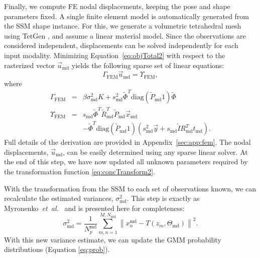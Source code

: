 \documentclass[journal]{IEEEtran}
\newcommand{\trans}[1]{#1^{\scriptscriptstyle T}}
\newcommand{\diag}{\mathrm{diag}}
\begin{document}
Finally, we compute FE nodal displacements, keeping the pose and shape parameters fixed.  A single finite element model is automatically generated from the SSM shape instance.  For this, we generate a volumetric tetrahedral mesh using TetGen \cite{Si06a}, and assume a linear material model.  Since the observations are considered independent, displacements can be solved independently for each input modality. Minimizing Equation~\eqref{eq:objTotal2} with respect to the rasterized vector $\vec{u}_\mathrm{md}$ yields the following sparse set of linear equations:
\begin{equation} \label{eq:FEM1}
\Gamma_{\mathrm{FEM}}\vec{u}_\mathrm{md} = \Upsilon_\mathrm{FEM},
\end{equation}
where 
\begin{eqnarray} \label{eq:FEM2}
 \Gamma_{\mathrm{FEM}} &=& \beta \sigma_\mathrm{md}^2K + s^2_\mathrm{md}\trans{\tilde{\Phi}}\diag(\tilde{P}_\mathrm{md}1)\tilde{\Phi}\\
 \Upsilon_{\mathrm{FEM}} &=& s_\mathrm{md}\trans{\tilde{\Phi}}\trans{\tilde{R}}_\mathrm{md}\tilde{P}_\mathrm{md}\vec{x}_\mathrm{md}\nonumber\\
 && -\trans{\tilde{\Phi}}\diag(\tilde{P}_\mathrm{md}1)\left(s_\mathrm{md}^2\vec{y}+s_\mathrm{md}\tilde{I}\trans{R_\mathrm{md}}t_\mathrm{md}\right)\nonumber.
\end{eqnarray}
Full details of the derivation are provided in Appendix~\ref{sec:app:fem}.  The nodal displacements, $\vec{u}_\mathrm{md}$, can be easily determined using any sparse linear solver.  At the end of this step, we have now updated all unknown parameters required by the transformation function \eqref{eq:concTransform2}. 

With the transformation from the SSM to each set of observations known, we can recalculate the estimated variances, $\sigma^2_\mathrm{md}$. This step is exactly as Myronenko~\textit{et~al.}~\cite{Myronenko10a} and is presented here for completeness:
\begin{equation} \label{eq:max1}
\sigma^2_\mathrm{md} = \frac{1}{N^\mathrm{md}_p}\sum^{M,N_\mathrm{md}}_{m,n=1}\left\|x^{\mathrm{md}}_n-T(z_m,\Theta_\mathrm{md})\right\|^2.
\end{equation}
With this new variance estimate, we can update the GMM probability distributions (Equation \eqref{eq:prob}).
\end{document}
